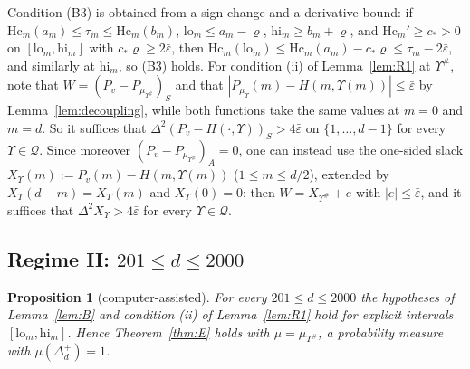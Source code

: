 \documentclass[11pt]{amsart}
\newtheorem{proposition}[theorem]{Proposition}
\theoremstyle{definition}
\theoremstyle{remark}
\numberwithin{equation}{section}
\begin{document}
Condition (B3) is obtained from a sign change and a derivative bound: if $\mathrm{Hc}_m(a_m)\le\tau_m\le\mathrm{Hc}_m(b_m)$,
$\mathrm{lo}_m\le a_m-\varrho$, $\mathrm{hi}_m\ge b_m+\varrho$, and $\mathrm{Hc}_m'\ge c_*>0$ on $[\mathrm{lo}_m,\mathrm{hi}_m]$ with
$c_*\varrho\ge2\bar\varepsilon$, then $\mathrm{Hc}_m(\mathrm{lo}_m)\le\mathrm{Hc}_m(a_m)-c_*\varrho\le\tau_m-2\bar\varepsilon$, and
similarly at $\mathrm{hi}_m$, so (B3) holds. For condition (ii) of Lemma~\ref{lem:R1} at $\Upsilon^\#$, note that
$W=(P_v-P_{\mu_{\Upsilon^\#}})_S$ and that $|P_{\mu_\Upsilon}(m)-H(m,\Upsilon(m))|\le\bar\varepsilon$ by
Lemma~\ref{lem:decoupling}, while both functions take the same values at $m=0$ and $m=d$. So it suffices that
$\Delta^2(P_v-H(\cdot,\Upsilon))_S>4\bar\varepsilon$ on $\{1,\dots,d-1\}$ for every $\Upsilon\in\mathcal Q$. Since moreover
$(P_v-P_{\mu_{\Upsilon^\#}})_A=0$, one can instead use the one-sided slack $X_\Upsilon(m):=P_v(m)-H(m,\Upsilon(m))$
($1\le m\le d/2$), extended by $X_\Upsilon(d-m)=X_\Upsilon(m)$ and $X_\Upsilon(0)=0$: then $W=X_{\Upsilon^\#}+e$ with
$|e|\le\bar\varepsilon$, and it suffices that $\Delta^2X_\Upsilon>4\bar\varepsilon$ for every $\Upsilon\in\mathcal Q$.

\subsection{Regime II: \texorpdfstring{$201\le d\le2000$}{201 <= d <= 2000}}\label{subsec:regimeII}

\begin{proposition}[computer-assisted]\label{prop:regimeII}
For every $201\le d\le2000$ the hypotheses of Lemma~\ref{lem:B} and condition (ii) of Lemma~\ref{lem:R1} hold for explicit
intervals $[\mathrm{lo}_m,\mathrm{hi}_m]$. Hence Theorem~\ref{thm:E} holds with $\mu=\mu_{\Upsilon^\#}$, a probability measure with
$\mu(\Delta_d^+)=1$.
\end{proposition}
\end{document}
